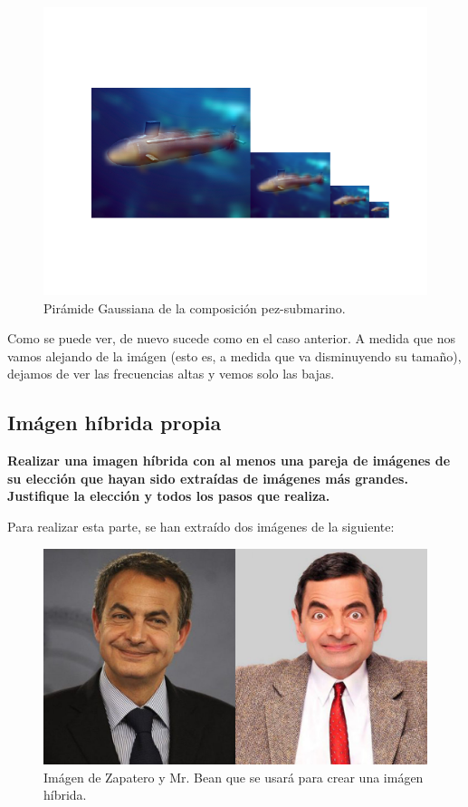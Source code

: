 \documentclass[11pt,a4paper]{article}
\begin{document}
\begin{figure}[H]
\centering
\includegraphics[scale=0.7]{img/c-hyb-pyr5.png}
\caption{Pirámide Gaussiana de la composición pez-submarino.}
\label{fig:c-hyb-pyr5}
\end{figure}

Como se puede ver, de nuevo sucede como en el caso anterior. A medida que nos vamos alejando de la imágen (esto es, a medida
que va disminuyendo su tamaño), dejamos de ver las frecuencias altas y vemos solo las bajas.

\subsection{Imágen híbrida propia}

\noindent \textbf{Realizar una imagen híbrida con al menos una pareja de imágenes de su elección que hayan
sido extraídas de imágenes más grandes. Justifique la elección y todos los pasos que realiza.}

Para realizar esta parte, se han extraído dos imágenes de la siguiente:

\begin{figure}[H]
\centering
\includegraphics[scale=0.35]{imagenes/zapabean.jpg}
\caption{Imágen de Zapatero y Mr. Bean que se usará para crear una imágen híbrida.}
\label{fig:zapa-bean}
\end{figure}
\end{document}
